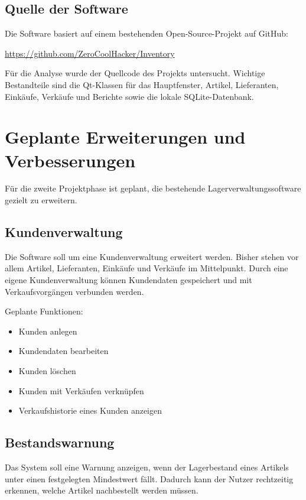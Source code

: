 \documentclass[12pt,a4paper]{article}
\begin{document}
	\subsection{Quelle der Software}
	
	Die Software basiert auf einem bestehenden Open-Source-Projekt auf GitHub:
	
	\begin{center}
		\url{https://github.com/ZeroCoolHacker/Inventory}
	\end{center}
	
	Für die Analyse wurde der Quellcode des Projekts untersucht. Wichtige
	Bestandteile sind die Qt-Klassen für das Hauptfenster, Artikel, Lieferanten,
	Einkäufe, Verkäufe und Berichte sowie die lokale SQLite-Datenbank.
	

	\section{Geplante Erweiterungen und Verbesserungen}
	
	Für die zweite Projektphase ist geplant, die bestehende Lagerverwaltungssoftware
	gezielt zu erweitern. 
	
	\subsection{Kundenverwaltung}
	
	Die Software soll um eine Kundenverwaltung erweitert werden. Bisher stehen vor
	allem Artikel, Lieferanten, Einkäufe und Verkäufe im Mittelpunkt. Durch eine
	eigene Kundenverwaltung können Kundendaten gespeichert und mit Verkaufsvorgängen
	verbunden werden.
	
	Geplante Funktionen:
	
	\begin{itemize}
		\item Kunden anlegen
		\item Kundendaten bearbeiten
		\item Kunden löschen
		\item Kunden mit Verkäufen verknüpfen
		\item Verkaufshistorie eines Kunden anzeigen
	\end{itemize}
	
	\subsection{Bestandswarnung}
	
	Das System soll eine Warnung anzeigen, wenn der Lagerbestand eines Artikels
	unter einen festgelegten Mindestwert fällt. Dadurch kann der Nutzer rechtzeitig
	erkennen, welche Artikel nachbestellt werden müssen.
	
\end{document}
